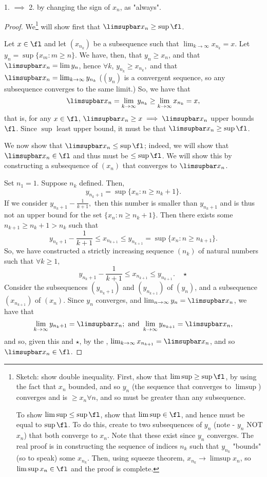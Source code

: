 \documentclass[12pt]{article}
\begin{document}
\begin{remark}
  1. $\implies$ 2. by changing the sign of $x_n$, as "always".
\end{remark}

\begin{proof}
  We\footnote{
  Sketch: show double inequality. First, show that $\limsup \geq \sup \fl$, by using the fact that $x_n$ bounded, and so $y_n$ (the sequence that converges to $\limsup$) converges and is $\geq x_n \forall n$, and so must be greater than any subsequence.

  To show $\limsup \leq \sup \fl$, show that $\limsup \in \fl$, and hence must be equal to $\sup \fl$. To do this, create to two subsequences of $y_n$ (note - $y_n$ NOT $x_n$) that both converge to $x_n$. Note that these exist since $y_n$ converges. The real proof is in constructing the sequence of indices $n_k$ such that $y_{n_k}$ "bounds" (so to speak) some $x_{n_k}$. Then, using squeeze theorem, $x_{n_k} \to \limsup x_n$, so $\limsup x_n \in \fl$ and the proof is complete.
  } will show first that $\limsupbar x_n \geq \sup \fl$.

  Let $x \in \fl$ and let $(x_{n_k})$ be a subsequence such that $\lim_{k\to\infty} x_{n_k} = x$. Let $y_n = \sup \{x_{m}: m \geq n\}$. We have, then, that $y_n \geq x_n$, and that $\limsupbar x_{n} = \lim y_n$, hence $\forall k$, $y_{n_k} \geq x_{n_k},$ and that $\limsupbar x_n = \lim_{k\to\infty} y_{n_k}$ ($(y_n)$ is a convergent sequence, so any subsequence converges to the same limit.) So, we have that $$\limsupbar x_n = \lim_{k\to\infty} y_{n_k} \geq \lim_{k\to\infty} x_{n_k} = x,$$ that is, for any $x \in \fl$, $\limsupbar x_n  \geq x \implies \limsupbar x_n$ upper bounds $\fl$. Since $\sup$ least upper bound, it must be that $\limsupbar x_n \geq \sup \fl$.

  We now show that $\limsupbar x_n \leq \sup \fl$; indeed, we will show that $\limsupbar x_n \in \fl$ and thus must be $\leq \sup \fl$. We will show this by constructing a subsequence of $(x_n)$ that converges to $\limsupbar x_n$.

  Set $n_1 = 1$. Suppose $n_k$ defined. Then, \[
  y_{n_k + 1} = \sup \{x_n : n \geq n_k + 1\}.  
  \]
  If we consider $y_{n_k + 1} - \frac{1}{k+1},$ then this number is smaller than $y_{n_k + 1}$ and is thus not an upper bound for the set $\{x_n :n \geq n_k + 1\}.$ Then there exists some $n_{k+1} \geq n_k + 1 > n_k$ such that \[
  y_{n_k + 1} - \frac{1}{k+1} \leq x_{n_{k+1}}   \leq y_{n_{k+1}} = \sup \{x_n : n \geq n_{k+1}\}.
  \]
  So, we have constructed a strictly increasing sequence $(n_k)$ of natural numbers such that $\forall k\geq 1,$ $$y_{n_k+1} - \frac{1}{k+1} \leq x_{n_{k+1}} \leq y_{n_{k+1}}. \quad \star$$ Consider the subsequences $(y_{n_k + 1})$ and $(y_{n_{k+1}})$ of $(y_n)$, and a subsequence $(x_{n_{k+1}})$ of $(x_n)$. Since $y_n$ converges, and $\lim_{n\to\infty} y_n = \limsupbar x_n$, we have that \[
    \lim_{k\to\infty} y_{n_k + 1} = \limsupbar x_n; \text{ and } \lim_{k\to\infty} y_{n_{k+1}} = \limsupbar x_n,
    \]
    and so, given this and $\star$, by the ,  $\lim_{k\to\infty} x_{n_{k+1}} = \limsupbar x_n$, and so $\limsupbar x_n \in \fl$.
\end{proof}
\end{document}
